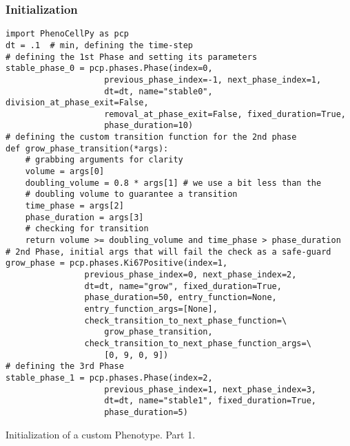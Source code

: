 \subsubsection{Initialization}\label{sec:meth:how-to-use:init}
\begin{listing}[H]
\begin{verbatim}
import PhenoCellPy as pcp
dt = .1  # min, defining the time-step
# defining the 1st Phase and setting its parameters
stable_phase_0 = pcp.phases.Phase(index=0, 
                    previous_phase_index=-1, next_phase_index=1, 
                    dt=dt, name="stable0", division_at_phase_exit=False, 
                    removal_at_phase_exit=False, fixed_duration=True, 
                    phase_duration=10)
# defining the custom transition function for the 2nd phase
def grow_phase_transition(*args):
    # grabbing arguments for clarity
    volume = args[0]
    doubling_volume = 0.8 * args[1] # we use a bit less than the 
    # doubling volume to guarantee a transition
    time_phase = args[2]
    phase_duration = args[3]
    # checking for transition
    return volume >= doubling_volume and time_phase > phase_duration
# 2nd Phase, initial args that will fail the check as a safe-guard
grow_phase = pcp.phases.Ki67Positive(index=1, 
                previous_phase_index=0, next_phase_index=2, 
                dt=dt, name="grow", fixed_duration=True, 
                phase_duration=50, entry_function=None, 
                entry_function_args=[None],
                check_transition_to_next_phase_function=\
                    grow_phase_transition,
                check_transition_to_next_phase_function_args=\
                    [0, 9, 0, 9])
# defining the 3rd Phase
stable_phase_1 = pcp.phases.Phase(index=2, 
                    previous_phase_index=1, next_phase_index=3,
                    dt=dt, name="stable1", fixed_duration=True, 
                    phase_duration=5)
\end{verbatim}
\caption{Initialization of a custom Phenotype. Part 1.}\label{code:pcp:init-custom}
\end{listing}

